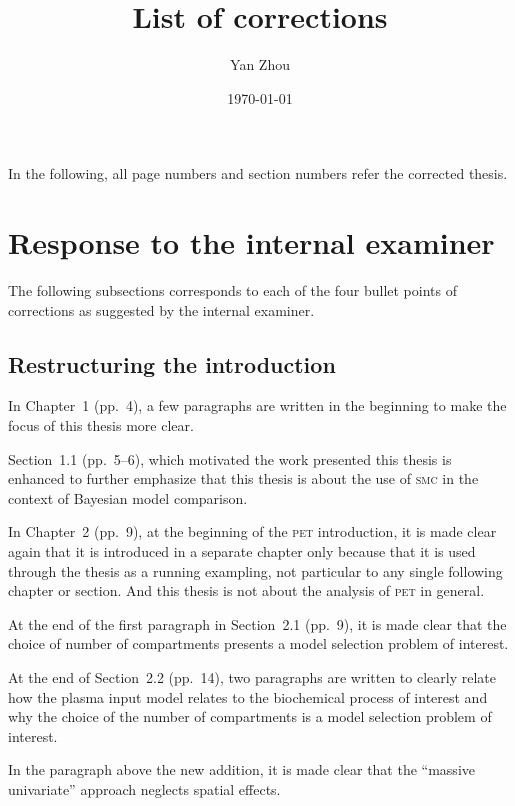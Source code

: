 \documentclass[11pt, fontset=Scala]{marticle}
\title{List of corrections}
\author{Yan Zhou}
\date{\today}
\begin{document}
\maketitle

In the following, all page numbers and section numbers refer the corrected thesis.

\section{Response to the internal examiner} %
\label{sec:response_to_the_internal_examiner}

The following subsections corresponds to each of the four bullet points of corrections as suggested by the internal examiner.

\subsection{Restructuring the introduction} %
\label{sub:restructuring_the_introduction_point_1_}

In Chapter~1 (pp.~4), a few paragraphs are written in the beginning to make the focus of this thesis more clear.

Section~1.1 (pp.~5--6), which motivated the work presented this thesis is enhanced to further emphasize that this thesis is about the use of \textsc{smc} in the context of Bayesian model comparison.

In Chapter~2 (pp.~9), at the beginning of the \textsc{pet} introduction, it is made clear again that it is introduced in a separate chapter only because that it is used through the thesis as a running exampling, not particular to any single following chapter or section. And this thesis is not about the analysis of \textsc{pet} in general.

At the end of the first paragraph in Section~2.1 (pp.~9), it is made clear that the choice of number of compartments presents a model selection problem of interest.

At the end of Section~2.2 (pp.~14), two paragraphs are written to clearly relate how the plasma input model relates to the biochemical process of interest and why the choice of the number of compartments is a model selection problem of interest.

In the paragraph above the new addition, it is made clear that the ``massive univariate'' approach neglects spatial effects.

\end{document}
